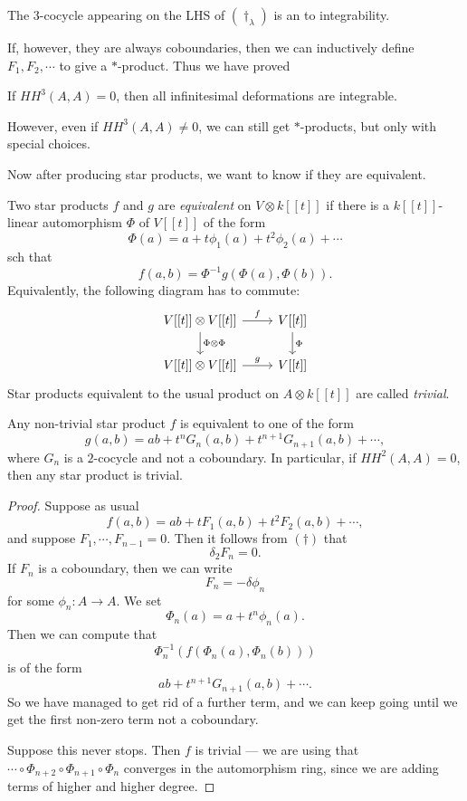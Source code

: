 \documentclass[a4paper]{article}
\newcommand\HH{H\!H}
\begin{document}
The $3$-cocycle appearing on the LHS of $(\dagger_\lambda)$ is an  to integrability.

If, however, they are always coboundaries, then we can inductively define $F_1, F_2, \cdots$ to give a $*$-product. Thus we have proved
\begin{thm}[Gerstenhaber]
  If $\HH^3(A, A) = 0$, then all infinitesimal deformations are integrable.
\end{thm}
However, even if $\HH^3(A, A) \not= 0$, we can still get $*$-products, but only with special choices.

Now after producing star products, we want to know if they are equivalent.

\begin{defi}
  Two star products $f$ and $g$ are \emph{equivalent} on $V \otimes k[[t]]$ if there is a $k[[t]]$-linear automorphism $\Phi$ of $V[[t]]$ of the form
  \[
    \Phi(a) = a + t \phi_1(a) + t^2 \phi_2(a) + \cdots
  \]
  sch that
  \[
    f(a, b) = \Phi^{-1} g(\Phi(a), \Phi(b)).
  \]
  Equivalently, the following diagram has to commute:
  \[
    \begin{tikzcd}
      V[[t]] \otimes V[[t]] \ar[r, "f"] \ar[d, "\Phi \otimes \Phi"] & V[[t]] \ar[d, "\Phi"]\\
      V[[t]] \otimes V[[t]] \ar[r, "g"] & V[[t]]
    \end{tikzcd}
  \]
  Star products equivalent to the usual product on $A \otimes k[[t]]$ are called \emph{trivial}.
\end{defi}

\begin{thm}[Gerstenhaber]
  Any non-trivial star product $f$ is equivalent to one of the form
  \[
    g(a, b) = ab + t^n G_n(a, b) + t^{n + 1} G_{n + 1}(a, b) + \cdots,
  \]
  where $G_n$ is a $2$-cocycle and not a coboundary. In particular, if $\HH^2(A, A) = 0$, then any star product is trivial.
\end{thm}

\begin{proof}
  Suppose as usual
  \[
    f(a, b) = ab + t F_1(a, b) + t^2 F_2(a, b) + \cdots,
  \]
  and suppose $F_1, \cdots, F_{n - 1} = 0$. Then it follows from $(\dagger)$ that
  \[
    \delta_2 F_n = 0.
  \]
  If $F_n$ is a coboundary, then we can write
  \[
    F_n = - \delta \phi_n
  \]
  for some $\phi_n: A \to A$. We set
  \[
    \Phi_n(a) = a + t^n \phi_n(a).
  \]
  Then we can compute that
  \[
    \Phi_n^{-1}(f (\Phi_n(a), \Phi_n(b)))
  \]
  is of the form
  \[
    ab + t^{n + 1}G_{n + 1}(a, b) + \cdots.
  \]
  So we have managed to get rid of a further term, and we can keep going until we get the first non-zero term not a coboundary.

  Suppose this never stops. Then $f$ is trivial --- we are using that $\cdots \circ \Phi_{n + 2} \circ \Phi_{n + 1} \circ \Phi_n$ converges in the automorphism ring, since we are adding terms of higher and higher degree.
\end{proof}
\end{document}
